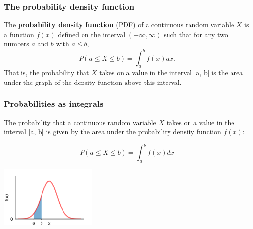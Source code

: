 \documentclass[9pt]{beamer}
\begin{document}
\begin{frame}
\frametitle{The probability density function}

\begin{definition} 
The \textbf{probability density function} (PDF) of a continuous random variable $X$ is a function $f(x)$ defined on the interval $(-\infty, \infty)$ such that for any two numbers $a$ and
$b$ with $a \leq b$,
\begin{equation*}
P(a \leq X \leq b) = \int_a^b f(x) dx.
\end{equation*} 
That is, the probability that $X$ takes on a value in the interval [a, b] is the area under the graph of the density function above this interval.
\end{definition}

\vspace{0.3cm}


\end{frame}

\begin{frame}
\frametitle{Probabilities as integrals}

The probability that a continuous random variable $X$ takes on a value in the interval [a, b] is given by the area under the probability density function $f(x)$:

\vspace{-0cm}

\begin{equation*}
P(a \leq X \leq b) = \int_a^b f(x) dx
\end{equation*}

\vspace{-0.2cm}
\begin{center}
\includegraphics[height=3cm]{images/normal_area.png}
\end{center}

\end{frame}
\end{document}
